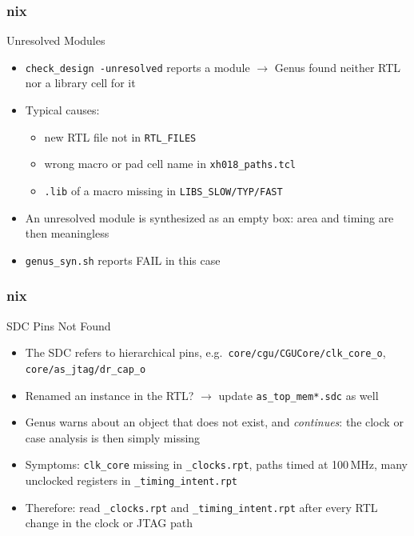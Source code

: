 \documentclass{beamer}
\newcommand{\astitle}{nix}
\newcommand{\assubtitle}{nix}
\newcommand{\cmd}[1]{\texttt{#1}}
\begin{document}
\renewcommand{\assubtitle}{Unresolved Modules}
\begin{frame}
\frametitle{\astitle}
\begin{block}{\assubtitle}
  \begin{itemize}
    \item \cmd{check\_design -unresolved} reports a module $\rightarrow$
      Genus found neither RTL nor a library cell for it
    \item Typical causes:
    \begin{itemize}
      \item new RTL file not in \cmd{RTL\_FILES}
      \item wrong macro or pad cell name in \cmd{xh018\_paths.tcl}
      \item \cmd{.lib} of a macro missing in \cmd{LIBS\_SLOW/TYP/FAST}
    \end{itemize}
    \item An unresolved module is synthesized as an empty box:
      area and timing are then meaningless
    \item \cmd{genus\_syn.sh} reports FAIL in this case
  \end{itemize}
\end{block}
\end{frame}

\renewcommand{\assubtitle}{SDC Pins Not Found}
\begin{frame}
\frametitle{\astitle}
\begin{block}{\assubtitle}
  \begin{itemize}
    \item The SDC refers to hierarchical pins, e.g.\
      \cmd{core/cgu/CGUCore/clk\_core\_o}, \cmd{core/as\_jtag/dr\_cap\_o}
    \item Renamed an instance in the RTL? $\rightarrow$ update
      \cmd{as\_top\_mem*.sdc} as well
    \item Genus warns about an object that does not exist, and \emph{continues}:
      the clock or case analysis is then simply missing
    \item Symptoms: \cmd{clk\_core} missing in \cmd{\_clocks.rpt}, paths timed at
      100\,MHz, many unclocked registers in \cmd{\_timing\_intent.rpt}
    \item Therefore: read \cmd{\_clocks.rpt} and \cmd{\_timing\_intent.rpt}
      after every RTL change in the clock or JTAG path
  \end{itemize}
\end{block}
\end{frame}
\end{document}
